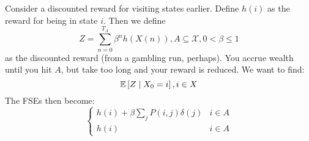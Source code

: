 \begin{note}
    Consider a discounted reward for visiting states earlier. Define $h(i)$ as the reward for being
    in state $i$. Then we define
    \[ Z = \sum_{n = 0}^{T_A} \beta^n h(X(n)), A \subseteq \mathcal{X}, 0 < \beta \leq 1 \]
    as the discounted reward (from a gambling run, perhaps). You accrue wealth until you hit $A$,
    but take too long and your reward is reduced. We want to find:
    \[ \mathbb{E}\left[ Z \mid X_0 = i \right], i \in X \]
    The FSEs then become:
    \[ \begin{cases}
        h(i) + \beta \sum_j P(i, j) \delta(j) & i \in A \\
        h(i) & i \in A
    \end{cases} \]
\end{note}
